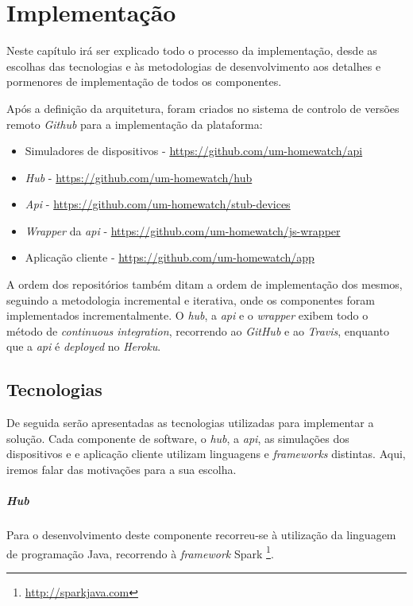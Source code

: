 \chapter{Implementação}

Neste capítulo irá ser explicado todo o processo da implementação, desde as escolhas das tecnologias e às metodologias de desenvolvimento aos detalhes e pormenores de implementação de todos os componentes.

Após a definição da arquitetura, foram criados no sistema de controlo de versões remoto \textit{Github} para a implementação da plataforma:
\begin{itemize}
    \item Simuladores de dispositivos - \url{https://github.com/um-homewatch/api}
    \item \textit{Hub} - \url{https://github.com/um-homewatch/hub}
    \item \textit{Api} - \url{https://github.com/um-homewatch/stub-devices}
    \item \textit{Wrapper} da \textit{api} - \url{https://github.com/um-homewatch/js-wrapper}
    \item Aplicação cliente - \url{https://github.com/um-homewatch/app}
\end{itemize}

A ordem dos repositórios também ditam a ordem de implementação dos mesmos, seguindo a metodologia incremental e iterativa, onde os componentes foram implementados incrementalmente. O \textit{hub}, a \textit{api} e o \textit{wrapper} exibem todo o método de \textit{continuous integration}, recorrendo ao \textit{GitHub} e ao \textit{Travis}, enquanto que a \textit{api} é \textit{deployed} no \textit{Heroku}.

\section{Tecnologias}
De seguida serão apresentadas as tecnologias utilizadas para implementar a solução. Cada componente de software, o \textit{hub}, a \textit{api}, as simulações dos dispositivos e e aplicação cliente utilizam linguagens e \textit{frameworks} distintas. Aqui, iremos falar das motivações para a sua escolha.

\paragraph*{Hub}
Para o desenvolvimento deste componente recorreu-se à utilização da linguagem de programação Java, recorrendo à \textit{framework} Spark \footnote{\url{http://sparkjava.com}}.

